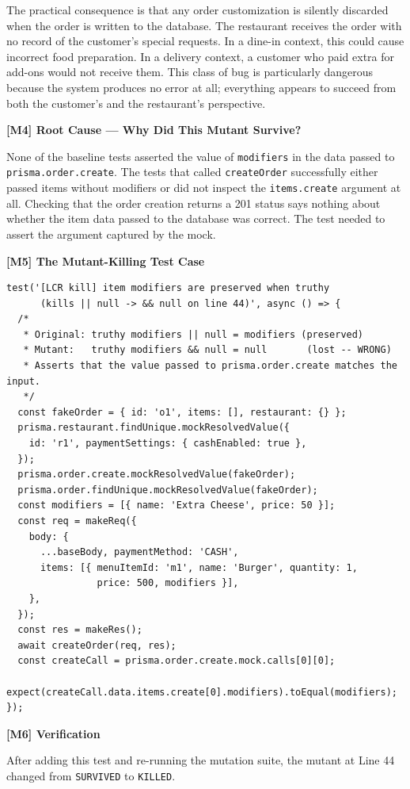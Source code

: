 \documentclass[12pt, a4paper]{article}
\begin{document}
The practical consequence is that any order customization is silently discarded when the order is written to the database. The restaurant receives the order with no record of the customer's special requests. In a dine-in context, this could cause incorrect food preparation. In a delivery context, a customer who paid extra for add-ons would not receive them. This class of bug is particularly dangerous because the system produces no error at all; everything appears to succeed from both the customer's and the restaurant's perspective.

\textbf{[M4] Root Cause --- Why Did This Mutant Survive?}

None of the baseline tests asserted the value of \texttt{modifiers} in the data passed to \texttt{prisma.order.create}. The tests that called \texttt{createOrder} successfully either passed items without modifiers or did not inspect the \texttt{items.create} argument at all. Checking that the order creation returns a 201 status says nothing about whether the item data passed to the database was correct. The test needed to assert the argument captured by the mock.

\textbf{[M5] The Mutant-Killing Test Case}

\begin{lstlisting}[caption={Test that kills Mutant 3}]
test('[LCR kill] item modifiers are preserved when truthy
      (kills || null -> && null on line 44)', async () => {
  /*
   * Original: truthy modifiers || null = modifiers (preserved)
   * Mutant:   truthy modifiers && null = null       (lost -- WRONG)
   * Asserts that the value passed to prisma.order.create matches the input.
   */
  const fakeOrder = { id: 'o1', items: [], restaurant: {} };
  prisma.restaurant.findUnique.mockResolvedValue({
    id: 'r1', paymentSettings: { cashEnabled: true },
  });
  prisma.order.create.mockResolvedValue(fakeOrder);
  prisma.order.findUnique.mockResolvedValue(fakeOrder);
  const modifiers = [{ name: 'Extra Cheese', price: 50 }];
  const req = makeReq({
    body: {
      ...baseBody, paymentMethod: 'CASH',
      items: [{ menuItemId: 'm1', name: 'Burger', quantity: 1,
                price: 500, modifiers }],
    },
  });
  const res = makeRes();
  await createOrder(req, res);
  const createCall = prisma.order.create.mock.calls[0][0];
  expect(createCall.data.items.create[0].modifiers).toEqual(modifiers);
});
\end{lstlisting}

\textbf{[M6] Verification}

After adding this test and re-running the mutation suite, the mutant at Line 44 changed from \texttt{SURVIVED} to \texttt{KILLED}.
\end{document}
